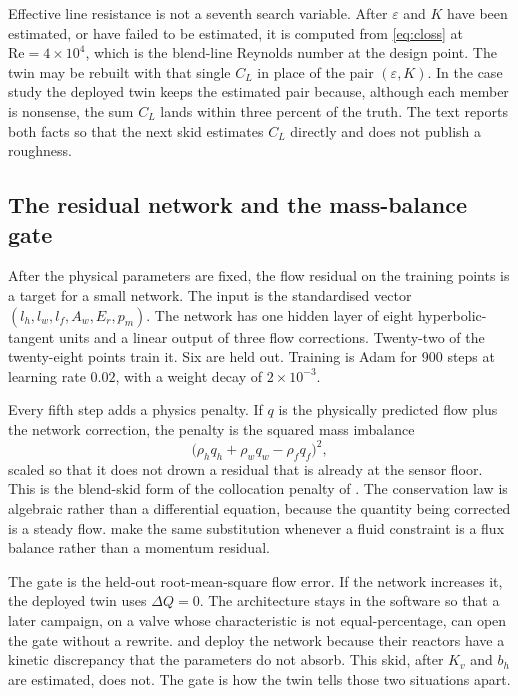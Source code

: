 Effective line resistance is not a seventh search variable. After $\varepsilon$ and $K$ have been estimated, or have failed to be estimated, it is computed from \eqref{eq:closs} at $\mathrm{Re}=4\times 10^{4}$, which is the blend-line Reynolds number at the design point. The twin may be rebuilt with that single $C_L$ in place of the pair $(\varepsilon,K)$. In the case study the deployed twin keeps the estimated pair because, although each member is nonsense, the sum $C_L$ lands within three percent of the truth. The text reports both facts so that the next skid estimates $C_L$ directly and does not publish a roughness.

\subsection{The residual network and the mass-balance gate}

After the physical parameters are fixed, the flow residual on the training points is a target for a small network. The input is the standardised vector $(l_h,l_w,l_f,A_w,E_r,p_m)$. The network has one hidden layer of eight hyperbolic-tangent units and a linear output of three flow corrections. Twenty-two of the twenty-eight points train it. Six are held out. Training is Adam for 900 steps at learning rate $0.02$, with a weight decay of $2\times 10^{-3}$.

Every fifth step adds a physics penalty. If $q$ is the physically predicted flow plus the network correction, the penalty is the squared mass imbalance
\begin{equation}
\label{eq:masspen}
\big(\rho_h q_h + \rho_w q_w - \rho_f q_f\big)^{2},
\end{equation}
scaled so that it does not drown a residual that is already at the sensor floor. This is the blend-skid form of the collocation penalty of \citet{raissi2019}. The conservation law is algebraic rather than a differential equation, because the quantity being corrected is a steady flow. \citet{cai2021} make the same substitution whenever a fluid constraint is a flux balance rather than a momentum residual.

The gate is the held-out root-mean-square flow error. If the network increases it, the deployed twin uses $\Delta Q = 0$. The architecture stays in the software so that a later campaign, on a valve whose characteristic is not equal-percentage, can open the gate without a rewrite. \citet{wu2023cerd} and \citet{zheng2023} deploy the network because their reactors have a kinetic discrepancy that the parameters do not absorb. This skid, after $K_v$ and $b_h$ are estimated, does not. The gate is how the twin tells those two situations apart.

